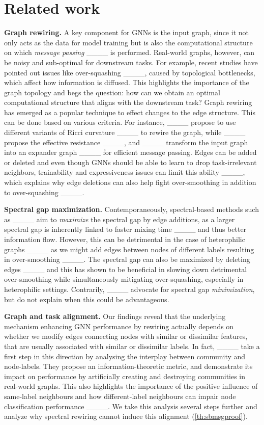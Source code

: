 \section{Related work}
\textbf{Graph rewiring.}
A key component for GNNs is the input graph, since it not only acts as the data for model training but is also the computational structure on which \emph{message passing} ____ is performed. Real-world graphs, however, can be noisy and sub-optimal for downstream tasks. For example, recent studies have pointed out issues like over-squashing ____, caused by topological bottlenecks, which affect how information is diffused. This highlights the importance of the graph topology and begs the question: how can we obtain an optimal computational structure that aligns with the downstream task? Graph rewiring has emerged as a popular technique to effect changes to the edge structure. This can be done based on various criteria. For instance, ____ propose to use different variants of Ricci curvature ____ to rewire the graph, while ____ propose the effective resistance ____, and ____ transform the input graph into an expander graph ____ for efficient message passing. 
Edges can be added or deleted and even though GNNs should be able to learn to drop task-irrelevant neighbors, trainability and expressiveness issues can limit this ability ____, which explains why edge deletions can also help fight over-smoothing in addition to over-squashing ____.

\textbf{Spectral gap maximization.}
Contemporaneously, spectral-based methods such as ____ aim to \textit{maximize} the spectral gap by edge additions, as a larger spectral gap is inherently linked to faster mixing time ____ and thus better information flow. However, this can be detrimental in the case of heterophilic graphs ____ as we might add edges between nodes of different labels resulting in over-smoothing ____. The spectral gap can also be maximized by deleting edges ____ and this has shown to be beneficial in slowing down detrimental over-smoothing while simultaneously mitigating over-squashing, especially in heterophilic settings. Contrarily, ____ advocate for spectral gap \textit{minimization}, but do not explain when this could be advantageous. 

\textbf{Graph and task alignment.}
Our findings reveal that the underlying mechanism enhancing GNN performance by rewiring actually depends on whether we modify edges connecting nodes with similar or dissimilar features, that are usually associated with similar or dissimilar labels. 
In fact, ____ take a first step in this direction by analysing the interplay between community and node-labels. 
They propose an information-theoretic metric, and demonstrate its impact on performance by artificially creating and destroying communities in real-world graphs. This also highlights the importance of the positive influence of same-label neighbours and how different-label neighbours can impair node classification performance ____.
We take this analysis several steps further and analyze why spectral rewiring cannot induce this alignment (\autoref{th:sbmsgproof}).  


